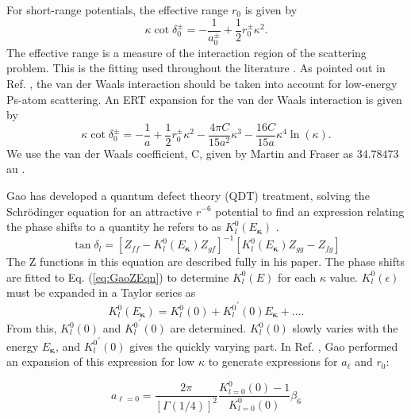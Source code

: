\documentclass[preprint,showpacs,preprintnumbers,amsmath,amssymb,longbibliography,pra,aps]{revtex4-1}
\begin{document}
For short-range potentials, the effective range $r_0$ is given by \cite{Bethe1949,Blatt1949}
\begin{equation}
\label{eq:EffectiveRangeShort}
\kappa \cot\delta_0^\pm = -\frac{1}{a_0^\pm} + \frac{1}{2} r_0^\pm \kappa^2.
\end{equation}
The effective range is a measure of the interaction region of the scattering problem. This is the fitting used throughout the literature \cite{Ivanov2002,VanReeth2003,Blackwood2002,Walters2004}. As pointed out in Ref. \cite{Fabrikant2014}, the van der Waals interaction should be taken into account for low-energy Ps-atom scattering. An ERT expansion for the van der Waals interaction is given by \cite{Drake2006}
\begin{equation}
\label{eq:EffectiveRangeLongAu}
\kappa \cot\delta_0^\pm = -\frac{1}{a} + \frac{1}{2} r_0^\pm \kappa^2 - \frac{4 \pi C}{15 a^2} \kappa^3 - \frac{16 C}{15 a} \kappa^4 \ln \left(\kappa \right).
\end{equation}
We use the van der Waals coefficient, C, given by Martin and Fraser as 34.78473 au \cite{Martin1980}.

Gao has developed a quantum defect theory (QDT) treatment, solving the Schr\"{o}dinger equation for an attractive $r^{-6}$ potential to find an expression relating the phase shifts to a quantity he refers to as $K_l^0(E_{\bm \kappa})$ \cite{Gao1998}.
\begin{equation}
\label{eq:GaoZEqn}
\tan\delta_l = [Z_{ff} - K_l^0(E_{\bm \kappa}) Z_{gf}]^{-1} [K_l^0(E_{\bm \kappa}) Z_{gg} - Z_{fg}]
\end{equation}
The Z functions in this equation are described fully in his paper. The phase shifts are fitted to Eq. (\ref{eq:GaoZEqn}) to determine $K_l^0(E)$ for each $\kappa$ value. $K_l^0(\epsilon)$ must be expanded in a Taylor series as
\begin{equation}
\label{eq:GaoKTaylor}
K_l^0(E_{\bm \kappa}) = K_l^0(0) + {K_l^0}^\prime(0) E_{\bm \kappa} + \ldots.
\end{equation}
From this, $K_l^0(0)$ and ${K_l^0}^\prime(0)$ are determined. $K_l^0(0)$ slowly varies with the energy $E_{\bm \kappa}$, and ${K_l^0}^\prime(0)$ gives the quickly varying part. In Ref. \cite{Gao1998a}, Gao performed an expansion of this expression for low $\kappa$ to generate expressions for $a_\ell$ and $r_0$:

\begin{equation}
\label{eq:GaoScatLenS}
a_{\ell=0} = \frac{2\pi}{[\Gamma(1/4)]^2} \frac{K_{l=0}^0(0) - 1}{K_{l=0}^0(0)} \beta_6
\end{equation}
\end{document}
